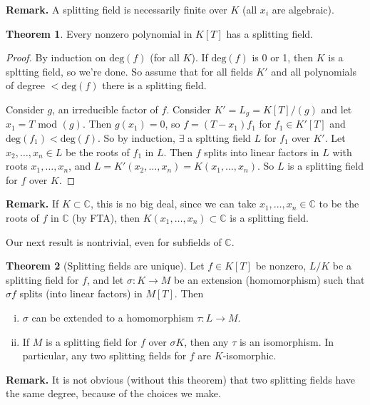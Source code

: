\documentclass{article}
\theoremstyle{definition}
\newtheorem{theorem}{Theorem}[section]
\begin{document}
\textbf{Remark.} A splitting field is necessarily finite over $K$ (all $x_i$ are algebraic).
\begin{theorem}\label{6.6}
    Every nonzero polynomial in $K[T]$ has a splitting field.
\end{theorem}
\begin{proof}
    By induction on $\text{deg}(f)$ (for all $K$). If $\text{deg}(f)$ is 0 or 1, then $K$ is a spltting field, so we're done. So assume that for all fields $K'$ and all polynomials of degree $<\text{deg}(f)$ there is a splitting field.
    \vspace{1mm}
    
    Consider $g$, an irreducible factor of $f$. Consider $K' = L_g = K[T]/(g)$ and let $x_1 = T$ mod $(g)$. Then $g(x_1)=0$, so $f = (T-x_1)f_1$ for $f_1 \in K'[T]$ and $\text{deg}(f_1)<\text{deg}(f)$. So by induction, $\exists$ a spltting field $L$ for $f_1$ over $K'$. Let $x_2,\ldots,x_n \in L$ be the roots of $f_1$ in $L$. Then $f$ splits into linear factors in $L$ with roots $x_1,\ldots,x_n$, and $L=K'(x_2,\ldots,x_n) = K(x_1,\ldots,x_n)$. So $L$ is a splitting field for $f$ over $K$.
\end{proof}


\vspace{1mm}

\textbf{Remark.} If $K \subset \mathbb{C}$, this is no big deal, since we can take $x_1,\ldots,x_n \in \mathbb{C}$ to be the roots of $f$ in $\mathbb{C}$ (by FTA), then $K(x_1,\ldots,x_n) \subset \mathbb{C}$ is a splitting field.
\vspace{1mm}

Our next result is nontrivial, even for subfields of $\mathbb{C}$.
\begin{theorem}[Splitting fields are unique]
    Let $f \in K[T]$ be nonzero, $L/K$ be a splitting field for $f$, and let $\sigma : K \to M$ be an extension (homomorphism) such that $\sigma f$ splits (into linear factors) in $M[T]$. Then
    \begin{enumerate}[(i)]
        \item $\sigma$ can be extended to a homomorphism $\tau : L \to M$.
        \item If $M$ is a splitting field for $f$ over $\sigma K$, then any $\tau$ is an isomorphism. In particular, any two splitting fields for $f$ are $K$-isomorphic.
    \end{enumerate}
\end{theorem}
\textbf{Remark.} It is not obvious (without this theorem) that two splitting fields have the same degree, because of the choices we make.
\end{document}
